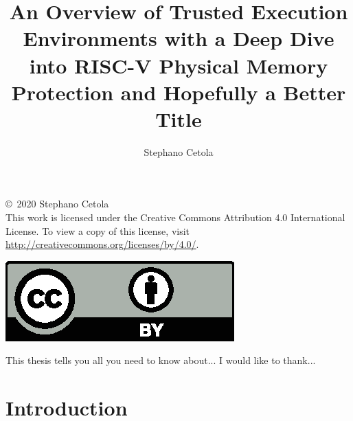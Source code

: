 \documentclass[12pt,oneside,letterpaper]{PSUreport}
\begin{document}
\title{An Overview of Trusted Execution Environments with a Deep Dive into RISC-V Physical Memory Protection and Hopefully a Better Title}
\subtitle{}
\author{Stephano Cetola}
\submitdate{\today}

\copyrightfalse
\figurespagetrue
\tablespagetrue
\null\vfill
\begin{center}
        \copyright\ 2020 Stephano Cetola \\
        This work is licensed under the Creative Commons Attribution 4.0 International License. To view a copy of this license, visit \url{http://creativecommons.org/licenses/by/4.0/}.
\end{center}
\begin{center}
\includegraphics{by}
\end{center}
\vfill\newpage
 
\beforepreface
{}
This thesis tells you all you need to know about...
I would like to thank...
\afterpreface

\printnoidxglossary[type=\acronymtype]

\glsresetall
\chapter{Introduction}




\end{document}
